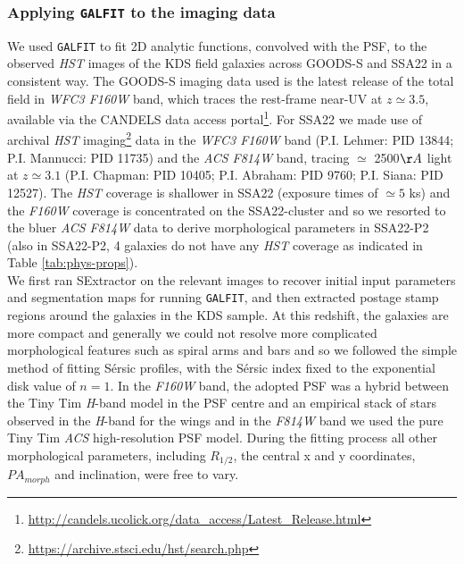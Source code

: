 \documentclass[fleqn,usenatbib]{mnras}
\newcommand{\Sers}{S\'{e}rsic }
\begin{document}
\subsubsection{Applying {\tt GALFIT} to the imaging data}\label{subsubsec:galfitting}
We used {\tt GALFIT} \citep{Peng2010_galfit} to fit 2D analytic functions, convolved with the PSF, to the observed {\em HST} images of the KDS field galaxies across GOODS-S and SSA22 in a consistent way.
The GOODS-S imaging data used is the latest release of the total field in {\it WFC3 F160W} band, which traces the rest-frame near-UV at $z\simeq3.5$, available via the CANDELS \citep{Grogin2011,Koekemoer2011} data access portal\footnote{\url{http://candels.ucolick.org/data_access/Latest_Release.html}}.
For SSA22 we made use of archival {\em HST} imaging\footnote{\url{https://archive.stsci.edu/hst/search.php}} data in the {\it WFC3 F160W} band (P.I. Lehmer: PID 13844; P.I. Mannucci: PID 11735) and the {\it ACS F814W} band, tracing $\simeq$ 2500$\AA$ light at $z\simeq3.1$ (P.I. Chapman: PID 10405; P.I. Abraham: PID 9760; P.I. Siana: PID 12527).
The {\em HST} coverage is shallower in SSA22 (exposure times of $\simeq5$ ks) and the {\it F160W} coverage is concentrated on the SSA22-cluster and so we resorted to the bluer {\it ACS F814W} data to derive morphological parameters in SSA22-P2 (also in SSA22-P2, 4 galaxies do not have any {\em HST} coverage as indicated in Table \ref{tab:phys-props}). \\

\noindent
We first ran SExtractor \citep{Bertin1996} on the relevant images to recover initial input parameters and segmentation maps for running {\tt GALFIT}, and then extracted postage stamp regions around the galaxies in the KDS sample.
At this redshift, the galaxies are more compact and generally we could not resolve more complicated morphological features such as spiral arms and bars and so we followed the simple method of fitting \Sers profiles, with the \Sers index fixed to the exponential disk value of $n=1$.
In the {\it F160W} band, the adopted PSF was a hybrid between the Tiny Tim {\it H}-band model \citep{Krist2011} in the PSF centre and an empirical stack of stars observed in the {\it H}-band for the wings \citep{VanderWel2012} and in the {\it F814W} band we used the pure Tiny Tim {\it ACS} high-resolution PSF model.
During the fitting process all other morphological parameters, including $R_{1/2}$, the central x and y coordinates, $PA_{morph}$ and inclination, were free to vary.
\end{document}
